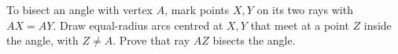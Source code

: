 To bisect an angle with vertex $A$, mark points $X,Y$ on its two rays with $AX=AY$. Draw equal-radius arcs centred at $X,Y$ that meet at a point $Z$ inside the angle, with $Z\ne A$. Prove that ray $AZ$ bisects the angle.
